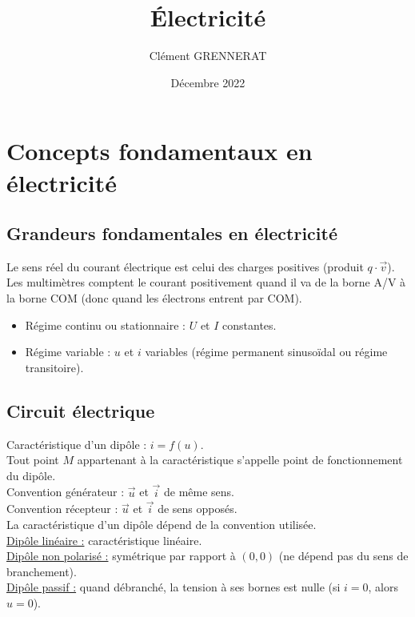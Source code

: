 \documentclass[13pt, twoside, a4paper, french]{report}
\newcommand*{\getSubject}{Électricité}
\begin{document}
\title{\getSubject}
\author{Clément GRENNERAT}
\date{Décembre 2022}
\pagestyle{non-chapter-style}


\chapter{Concepts fondamentaux en électricité}\label{ch:concepts-fondamentaux-en-electricite}
  
  
  \section{Grandeurs fondamentales en électricité}\label{sec:grandeurs-fondamentales-en-electricite}
    
    Le sens réel du courant électrique est celui des charges positives (produit $q \cdot \vec v$).\\
    
    Les multimètres comptent le courant positivement quand il va de la borne A/V à la borne COM (donc quand les électrons entrent par COM).\\
    
    \begin{itemize}
      \item Régime continu ou stationnaire : $U$ et $I$ constantes.
      \item Régime variable : $u$ et $i$ variables (régime permanent sinusoïdal ou régime transitoire).
    \end{itemize}
  
  
  \section{Circuit électrique}\label{sec:circuit-electrique}
    
    Caractéristique d'un dipôle : $i = f(u)$.\\
    Tout point $M$ appartenant à la caractéristique s'appelle point de fonctionnement du dipôle.\\
    
    Convention générateur : $\vec u$ et $\vec i$ de même sens.\\
    Convention récepteur : $\vec u$ et $\vec i$ de sens opposés.\\
    La caractéristique d'un dipôle dépend de la convention utilisée.\\
    
    \underline{Dipôle linéaire :} caractéristique linéaire.\\
    \underline{Dipôle non polarisé :} symétrique par rapport à $(0, 0)$ (ne dépend pas du sens de branchement).\\
    \underline{Dipôle passif :} quand débranché, la tension à ses bornes est nulle (si $i = 0$, alors $u = 0$).\\
  
\end{document}
